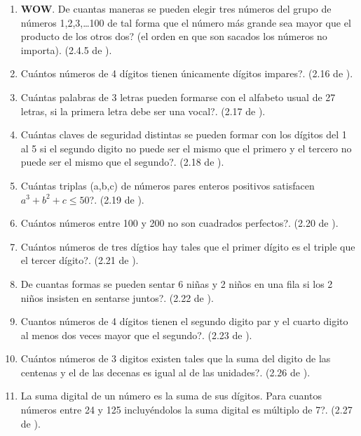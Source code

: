\begin{enumerate}
	\item \textbf{WOW}. De cuantas maneras se pueden elegir tres números del grupo de números 1,2,3,…100 de tal forma que el número más grande sea mayor que el producto de los otros dos? (el orden en que son sacados los números no importa). (2.4.5 de \cite{ICP_Aops}).
	
	\item Cuántos números de 4 dígitos tienen únicamente dígitos impares?. (2.16 de \cite{ICP_Aops}).
	
	\item Cuántas palabras de 3 letras pueden formarse con el alfabeto usual de 27 letras, si la primera letra debe ser una vocal?. (2.17 de \cite{ICP_Aops}).
	
	\item Cuántas claves de seguridad distintas se pueden formar con los dígitos del 1 al 5 si el segundo digito no puede ser el mismo que el primero y el tercero no puede ser el mismo que el segundo?. (2.18 de \cite{ICP_Aops}).
	
	\item Cuántas triplas (a,b,c) de números pares enteros positivos satisfacen $a^3+b^2+c\leq 50$?. (2.19 de \cite{ICP_Aops}).
	
	\item Cuántos números entre 100 y 200 no son cuadrados perfectos?. (2.20 de \cite{ICP_Aops}).
	
	\item Cuántos números de tres dígtios hay tales que el primer dígito es el triple que el tercer dígito?. (2.21 de \cite{ICP_Aops}).
	
	\item De cuantas formas se pueden sentar 6 niñas y 2 niños en una fila si los 2 niños insisten en sentarse juntos?. (2.22 de \cite{ICP_Aops}).
	
	\item Cuantos números de 4 dígitos tienen el segundo digito par y el cuarto digito al menos dos veces mayor que el segundo?. (2.23 de \cite{ICP_Aops}).
	
	\item Cuántos números de 3 digitos existen tales que la suma del digito de las centenas y el de las decenas es igual al de las unidades?. (2.26 de \cite{ICP_Aops}).
	
	\item La suma digital de un número es la suma de sus dígitos. Para cuantos números entre 24 y 125 incluyéndolos la suma digital es múltiplo de 7?. (2.27 de \cite{ICP_Aops}).
	

\end{enumerate}
